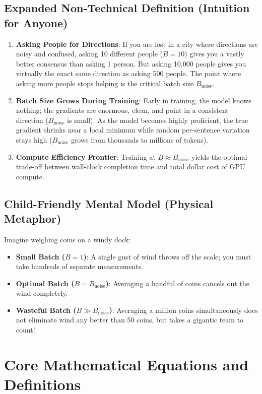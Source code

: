 \documentclass[11pt,a4paper]{article}
\theoremstyle{definition}
\begin{document}
\subsection{Expanded Non-Technical Definition (Intuition for Anyone)}
\begin{enumerate}
    \item \textbf{Asking People for Directions}: If you are lost in a city where directions are noisy and confused, asking 10 different people ($B = 10$) gives you a vastly better consensus than asking 1 person. But asking 10,000 people gives you virtually the exact same direction as asking 500 people. The point where asking more people stops helping is the critical batch size $B_{\text{noise}}$.
    \item \textbf{Batch Size Grows During Training}: Early in training, the model knows nothing; the gradients are enormous, clean, and point in a consistent direction ($B_{\text{noise}}$ is small). As the model becomes highly proficient, the true gradient shrinks near a local minimum while random per-sentence variation stays high ($B_{\text{noise}}$ grows from thousands to millions of tokens).
    \item \textbf{Compute Efficiency Frontier}: Training at $B \approx B_{\text{noise}}$ yields the optimal trade-off between wall-clock completion time and total dollar cost of GPU compute.
\end{enumerate}

\subsection{Child-Friendly Mental Model (Physical Metaphor)}
Imagine weighing coins on a windy dock:
\begin{itemize}
    \item \textbf{Small Batch ($B=1$)}: A single gust of wind throws off the scale; you must take hundreds of separate measurements.
    \item \textbf{Optimal Batch ($B = B_{\text{noise}}$)}: Averaging a handful of coins cancels out the wind completely.
    \item \textbf{Wasteful Batch ($B \gg B_{\text{noise}}$)}: Averaging a million coins simultaneously does not eliminate wind any better than 50 coins, but takes a gigantic team to count!
\end{itemize}

\section{Core Mathematical Equations and Definitions}
\end{document}
